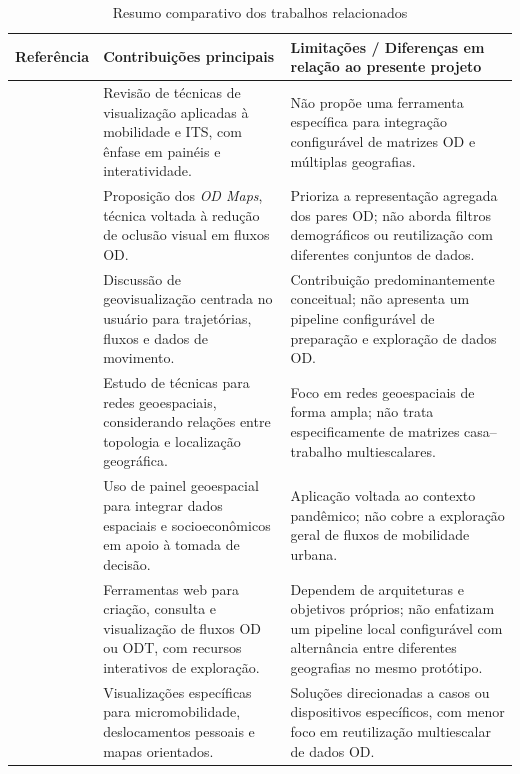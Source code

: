\documentclass[12pt]{article}
\begin{document}
\begin{table}[ht]
\centering
\footnotesize
\caption{Resumo comparativo dos trabalhos relacionados}
\label{tab:relacionados}
\begin{tabular}{p{3.7cm} p{5.2cm} p{4.4cm}}
\hline
\textbf{Referência} & \textbf{Contribuições principais} & \textbf{Limitações / Diferenças em relação ao presente projeto} \\ \hline
\cite{s19020332} & Revisão de técnicas de visualização aplicadas à mobilidade e ITS, com ênfase em painéis e interatividade. & Não propõe uma ferramenta específica para integração configurável de matrizes OD e múltiplas geografias. \\ \hline
\cite{Wood01052010} & Proposição dos \textit{OD Maps}, técnica voltada à redução de oclusão visual em fluxos OD. & Prioriza a representação agregada dos pares OD; não aborda filtros demográficos ou reutilização com diferentes conjuntos de dados. \\ \hline
\cite{Dodge04072021} & Discussão de geovisualização centrada no usuário para trajetórias, fluxos e dados de movimento. & Contribuição predominantemente conceitual; não apresenta um pipeline configurável de preparação e exploração de dados OD. \\ \hline
\cite{schottler2021visualizing} & Estudo de técnicas para redes geoespaciais, considerando relações entre topologia e localização geográfica. & Foco em redes geoespaciais de forma ampla; não trata especificamente de matrizes casa--trabalho multiescalares. \\ \hline
\cite{Praharaj} & Uso de painel geoespacial para integrar dados espaciais e socioeconômicos em apoio à tomada de decisão. & Aplicação voltada ao contexto pandêmico; não cobre a exploração geral de fluxos de mobilidade urbana. \\ \hline
\cite{koylu2021flowmapper,li2020odtflowexplorer} & Ferramentas web para criação, consulta e visualização de fluxos OD ou ODT, com recursos interativos de exploração. & Dependem de arquiteturas e objetivos próprios; não enfatizam um pipeline local configurável com alternância entre diferentes geografias no mesmo protótipo. \\ \hline
\cite{Koktavá_Horák_2023,Nelson04052023,Gorte02012022} & Visualizações específicas para micromobilidade, deslocamentos pessoais e mapas orientados. & Soluções direcionadas a casos ou dispositivos específicos, com menor foco em reutilização multiescalar de dados OD. \\ \hline
\end{tabular}
\end{table}
\end{document}
